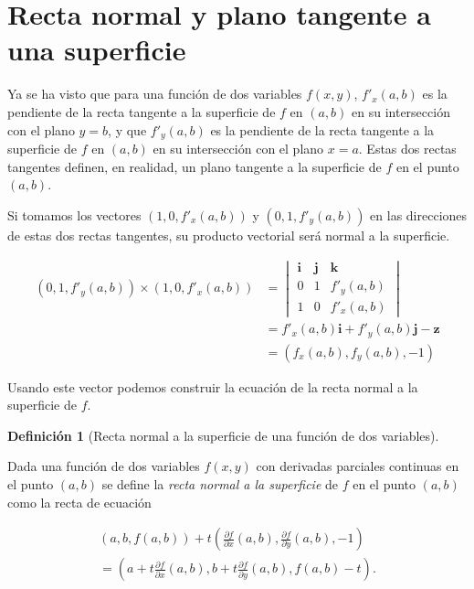 \documentclass[
  a4paper,
]{scrreport}
\theoremstyle{definition}
\newtheorem{definition}{Definición}[chapter]
\theoremstyle{plain}
\theoremstyle{plain}
\theoremstyle{definition}
\theoremstyle{definition}
\theoremstyle{plain}
\theoremstyle{remark}
\begin{document}
\hypertarget{recta-normal-y-plano-tangente-a-una-superficie}{%
\section{Recta normal y plano tangente a una
superficie}\label{recta-normal-y-plano-tangente-a-una-superficie}}

Ya se ha visto que para una función de dos variables \(f(x,y)\),
\(f'_{x}(a,b)\) es la pendiente de la recta tangente a la superficie de
\(f\) en \((a,b)\) en su intersección con el plano \(y=b\), y que
\(f'_y(a,b)\) es la pendiente de la recta tangente a la superficie de
\(f\) en \((a,b)\) en su intersección con el plano \(x=a\). Estas dos
rectas tangentes definen, en realidad, un plano tangente a la superficie
de \(f\) en el punto \((a,b)\).

Si tomamos los vectores \((1, 0, f'_x(a,b))\) y \((0, 1, f'_y(a,b))\) en
las direcciones de estas dos rectas tangentes, su producto vectorial
será normal a la superficie.

\begin{align*}
(0, 1, f'_y(a,b)) \times (1, 0, f'_x(a,b))
&= 
\begin{vmatrix}
\mathbf{i} & \mathbf{j} & \mathbf{k} \\
0 & 1 & f'_y(a,b) \\
1 & 0 & f'_x(a,b) 
\end{vmatrix} \\
&= f'_x(a,b) \mathbf{i} + f'_y(a,b) \mathbf{j} - \mathbf{z} \\
&= (f_x(a,b), f_y(a,b), -1)
\end{align*}

Usando este vector podemos construir la ecuación de la recta normal a la
superficie de \(f\).

\begin{definition}[Recta normal a la superficie de una función de dos
variables]\protect\hypertarget{def-recta-normal-superficie}{}\label{def-recta-normal-superficie}

Dada una función de dos variables \(f(x,y)\) con derivadas parciales
continuas en el punto \((a,b)\) se define la \emph{recta normal a la
superficie} de \(f\) en el punto \((a,b)\) como la recta de ecuación

\[
\begin{gathered}
(a, b, f(a,b)) + t \left(\frac{\partial f}{\partial x}(a,b), \frac{\partial f}{\partial y}(a,b), -1\right) \\
= \left(a+t\frac{\partial f}{\partial x}(a,b), b+t\frac{\partial f}{\partial y}(a,b), f(a,b)-t\right).
\end{gathered}
\]

\end{definition}
\end{document}
